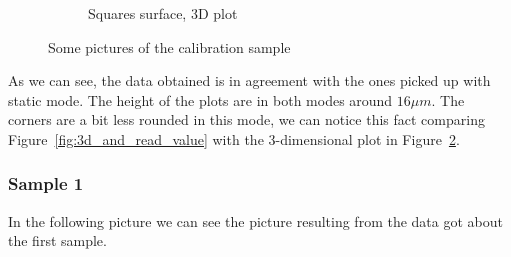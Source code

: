 \documentclass[11pt,a4paper]{article}
\begin{document}
\begin{figure}[H]
\begin{subfigure}[b]{0.45\textwidth}
\caption{Squares surface, 3D plot}
\label{fig:sm_border}
\end{subfigure}
\caption{Some pictures of the calibration sample}\label{fig:: tm cal}
\end{figure}
As we can see, the data obtained is in agreement with the ones picked up with static mode. The height of the plots are in both modes around $16\mu m$. The corners are a bit less rounded in this mode, we can notice this fact comparing Figure~\ref{fig:3d_and_read_value} with the 3-dimensional plot in Figure~\ref{fig:: tm cal}.

\subsubsection{Sample 1}
In the following picture we can see the picture resulting from the data got about the first sample.
\end{document}
